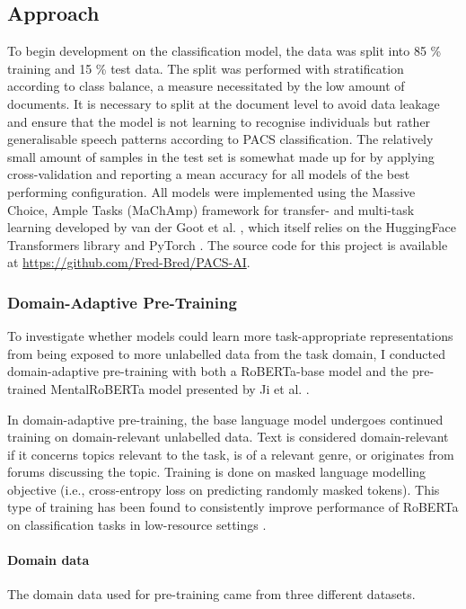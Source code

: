 \documentclass[12pt]{report}
\begin{document}
\subsection{Approach}
To begin development on the classification model, the data was split into 85 \% training and 15 \% test data.
The split was performed with stratification according to class balance, a measure necessitated by the low amount of documents.
It is necessary to split at the document level to avoid data leakage and ensure that the model is not learning to recognise individuals but rather generalisable speech patterns according to PACS classification.
The relatively small amount of samples in the test set is somewhat made up for by applying cross-validation and reporting a mean accuracy for all models of the best performing configuration.
All models were implemented using the Massive Choice, Ample Tasks (MaChAmp) framework for transfer- and multi-task learning developed by van der Goot et al. \citeyear{MaChAmp}, which itself relies on the HuggingFace Transformers library \cite{HuggingFace} and PyTorch \cite{PyTorch}.
The source code for this project is available at \url{https://github.com/Fred-Bred/PACS-AI}.

\subsubsection{Domain-Adaptive Pre-Training}
To investigate whether models could learn more task-appropriate representations from being exposed to more unlabelled data from the task domain, I conducted domain-adaptive pre-training with both a RoBERTa-base model \cite{roberta} and the pre-trained MentalRoBERTa model presented by Ji et al. \citeyear{MentalBERT}.

In domain-adaptive pre-training, the base language model undergoes continued training on domain-relevant unlabelled data.
Text is considered domain-relevant if it concerns topics relevant to the task, is of a relevant genre, or originates from forums discussing the topic.
Training is done on masked language modelling objective (i.e., cross-entropy loss on predicting randomly masked tokens).
This type of training has been found to consistently improve performance of RoBERTa on classification tasks in low-resource settings \cite{Gururangan2020}.

\paragraph*{Domain data}
The domain data used for pre-training came from three different datasets.
\end{document}
